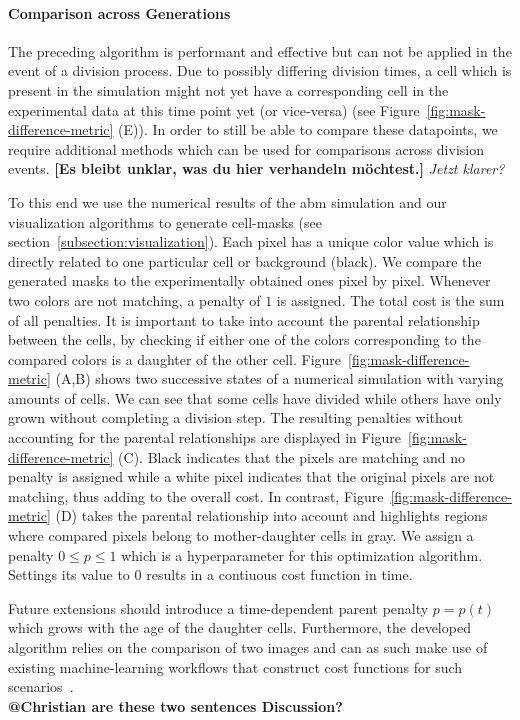 \documentclass{article}
\begin{document}
\paragraph{Comparison across Generations}
The preceding algorithm is performant and effective but can not be applied in the event of a
division process.
Due to possibly differing division times, a cell which is present in the simulation might not yet
have a corresponding cell in the experimental data at this time point yet (or vice-versa) (see
Figure~\ref{fig:mask-difference-metric} (E)).
In order to still be able to compare these datapoints, we require additional methods which can be
used for comparisons across division events.
\textbf{[Es bleibt unklar, was du hier verhandeln möchtest.]}
\textit{Jetzt klarer?}

To this end we use the numerical results of the \ac{abm} simulation and our visualization
algorithms to generate cell-masks (see section~\ref{subsection:visualization}).
Each pixel has a unique color value which is directly related to one particular cell or background
(black).
We compare the generated masks to the experimentally obtained ones pixel by pixel.
Whenever two colors are not matching, a penalty of $1$ is assigned.
The total cost is the sum of all penalties.
It is important to take into account the parental relationship between the cells, by checking if
either one of the colors corresponding to the compared colors is a daughter of the other cell.
Figure~\ref{fig:mask-difference-metric} (A,B) shows two successive states of a numerical simulation
with varying amounts of cells.
We can see that some cells have divided while others have only grown without completing a division
step.
The resulting penalties without accounting for the parental relationships are displayed in
Figure~\ref{fig:mask-difference-metric} (C).
Black indicates that the pixels are matching and no penalty is assigned while a white pixel
indicates that the original pixels are not matching, thus adding to the overall cost.
In contrast, Figure~\ref{fig:mask-difference-metric} (D) takes the parental relationship into
account and highlights regions where compared pixels belong to mother-daughter cells in gray.
We assign a penalty $0\leq p \leq 1$ which is a hyperparameter for this optimization algorithm.
Settings its value to $0$ results in a contiuous cost function in time.

Future extensions should introduce a time-dependent parent penalty $p=p(t)$ which grows with the age
of the daughter cells.
Furthermore, the developed algorithm relies on the comparison of two images and can as such make use
of existing machine-learning workflows that construct cost functions for such
scenarios~\cite{Dice1945}.\\
\textbf{@Christian are these two sentences Discussion?}
\end{document}

